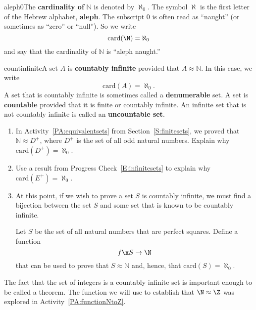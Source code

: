 \begin{defbox}{aleph0}{The \textbf{cardinality of} $\boldsymbol{\mathbb{N}}$
%
%
%
 is denoted by $\aleph_0$.  
\label{sym:aleph0}%
 The symbol $\aleph$ is the first letter of the Hebrew alphabet, \textbf{aleph}.
%
  The subscript 0 is often read as ``naught'' (or sometimes as ``zero'' or ``null'').  So we write
\[
\text{card}( \N ) = \aleph_0
\]
and say that the cardinality of $\mathbb{N}$ is ``aleph naught.''}
\end{defbox}
%
\begin{defbox}{countinfinite}{A set $A$ is \textbf{countably infinite}
%
 provided that 
$A \approx \mathbb{N}$.  In this case, we write
\[
\text{card}( A ) = \aleph_0.
\]
A set that is countably infinite is sometimes called a \textbf{denumerable}
%
 set.  A set is 
\textbf{countable}
%
 provided that it is finite or countably infinite.  An infinite set that is not countably infinite is called an \textbf{uncountable set}.
%
}
\end{defbox}
%
\begin{prog}\label{prog:countablyinfinitesets} \hfill
\begin{enumerate}
\item In \typeu Activity~\ref*{PA:equivalentsets} from Section~\ref{S:finitesets}, we proved that 
$\mathbb{N} \approx D^+$, where $D^+$ is the set of all odd natural numbers.  Explain why 
$\text{card}( D^+ ) = \aleph_0$.

\item Use a result from Progress Check~\ref{E:infinitesets} to explain why 
$\text{card}( E^+ ) = \aleph_0$.

\item At this point, if we wish to prove a set $S$ is countably infinite, we must find a bijection between the set $S$ and some set that is known to be countably infinite.

Let $S$ be the set of all natural numbers that are perfect squares.  Define a function 
\[
f\x S \to \mathbb{\N}
\]
that can be used to prove that $S \approx \mathbb{N}$ and, hence, that 
$\text{card}( S ) = \aleph_0$.
\end{enumerate}
\end{prog}\hbreak
%
The fact that the set of integers is a countably infinite set is important enough to be called a theorem.  The function we will use to establish that $\N \approx \Z$ was explored in \typeu Activity~\ref*{PA:functionNtoZ}.

